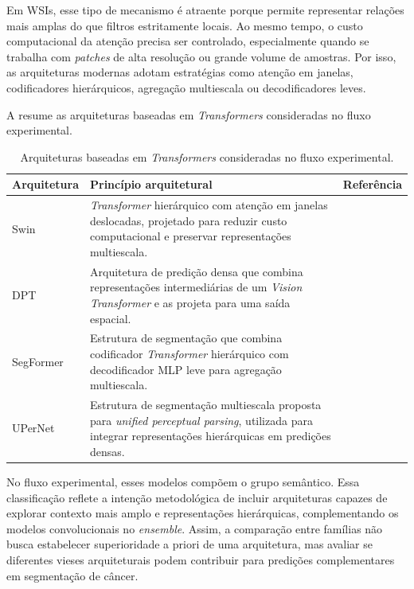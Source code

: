 Em WSIs, esse tipo de mecanismo é atraente porque permite representar relações
mais amplas do que filtros estritamente locais. Ao mesmo tempo, o custo
computacional da atenção precisa ser controlado, especialmente quando se trabalha
com \textit{patches} de alta resolução ou grande volume de amostras. Por isso,
as arquiteturas modernas adotam estratégias como atenção em janelas,
codificadores hierárquicos, agregação multiescala ou decodificadores leves.

A  resume as arquiteturas baseadas em
\textit{Transformers} consideradas no fluxo experimental.

\begin{table}[!htb]
\centering
\caption{Arquiteturas baseadas em \textit{Transformers} consideradas no fluxo experimental.}
\label{tab:transformer-models}
\begin{tabular}{p{2.8cm}p{8.4cm}p{3.0cm}}
\toprule
Arquitetura & Princípio arquitetural & Referência \\
\midrule
Swin &
\textit{Transformer} hierárquico com atenção em janelas deslocadas, projetado
para reduzir custo computacional e preservar representações multiescala. &
\cite{liu2021swin} \\

DPT &
Arquitetura de predição densa que combina representações intermediárias de um
\textit{Vision Transformer} e as projeta para uma saída espacial. &
\cite{ranftl2021dpt} \\

SegFormer &
Estrutura de segmentação que combina codificador \textit{Transformer}
hierárquico com decodificador MLP leve para agregação multiescala. &
\cite{xie2021segformer} \\

UPerNet &
Estrutura de segmentação multiescala proposta para \textit{unified perceptual
parsing}, utilizada para integrar representações hierárquicas em predições
densas. &
\cite{xiao2018upernet} \\
\bottomrule
\end{tabular}
\end{table}

No fluxo experimental, esses modelos compõem o grupo semântico. Essa
classificação reflete a intenção metodológica de incluir arquiteturas capazes de
explorar contexto mais amplo e representações hierárquicas, complementando os
modelos convolucionais no \textit{ensemble}. Assim, a comparação entre famílias
não busca estabelecer superioridade a priori de uma arquitetura, mas avaliar se
diferentes vieses arquiteturais podem contribuir para predições complementares
em segmentação de câncer.

